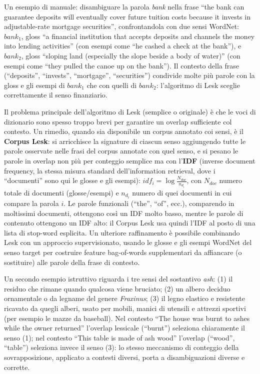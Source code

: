 \documentclass[11pt,a4paper]{report}
\begin{document}
Un esempio di manuale: disambiguare la parola \emph{bank} nella frase ``the bank can guarantee deposits will eventually cover future tuition costs because it invests in adjustable-rate mortgage securities'', confrontandola con due sensi WordNet: $bank_1$, gloss ``a financial institution that accepts deposits and channels the money into lending activities'' (con esempi come ``he cashed a check at the bank''), e $bank_2$, gloss ``sloping land (especially the slope beside a body of water)'' (con esempi come ``they pulled the canoe up on the bank''). Il contesto della frase (``deposits'', ``invests'', ``mortgage'', ``securities'') condivide molte più parole con la gloss e gli esempi di $bank_1$ che con quelli di $bank_2$: l'algoritmo di Lesk sceglie correttamente il senso finanziario.

Il problema principale dell'algoritmo di Lesk (semplice o originale) è che le voci di dizionario sono spesso troppo brevi per garantire un overlap sufficiente col contesto. Un rimedio, quando sia disponibile un corpus annotato coi sensi, è il \textbf{Corpus Lesk}: si arricchisce la signature di ciascun senso aggiungendo tutte le parole osservate nelle frasi del corpus annotate con quel senso, e si pesano le parole in overlap non più per conteggio semplice ma con l'\textbf{IDF} (inverse document frequency, la stessa misura standard dell'information retrieval, dove i ``documenti'' sono qui le glosse e gli esempi): $idf_i = \log \frac{N_{doc}}{n_{d_i}}$, con $N_{doc}$ numero totale di documenti (glosse/esempi) e $n_{d_i}$ numero di quei documenti in cui compare la parola $i$. Le parole funzionali (``the'', ``of'', ecc.), comparendo in moltissimi documenti, ottengono così un IDF molto basso, mentre le parole di contenuto ottengono un IDF alto: il Corpus Lesk usa quindi l'IDF al posto di una lista di stop-word esplicita. Un ulteriore raffinamento è possibile combinando Lesk con un approccio supervisionato, usando le glosse e gli esempi WordNet del senso target per costruire feature bag-of-words supplementari da affiancare (o sostituire) alle parole della frase di contesto.

Un secondo esempio istruttivo riguarda i tre sensi del sostantivo \emph{ash}: (1) il residuo che rimane quando qualcosa viene bruciato; (2) un albero deciduo ornamentale o da legname del genere \emph{Fraxinus}; (3) il legno elastico e resistente ricavato da quegli alberi, usato per mobili, manici di utensili e attrezzi sportivi (per esempio le mazze da baseball). Nel contesto ``The house was burnt to ashes while the owner returned'' l'overlap lessicale (``burnt'') seleziona chiaramente il senso (1); nel contesto ``This table is made of ash wood'' l'overlap (``wood'', ``table'') seleziona invece il senso (3): lo stesso meccanismo di conteggio della sovrapposizione, applicato a contesti diversi, porta a disambiguazioni diverse e corrette.
\end{document}
